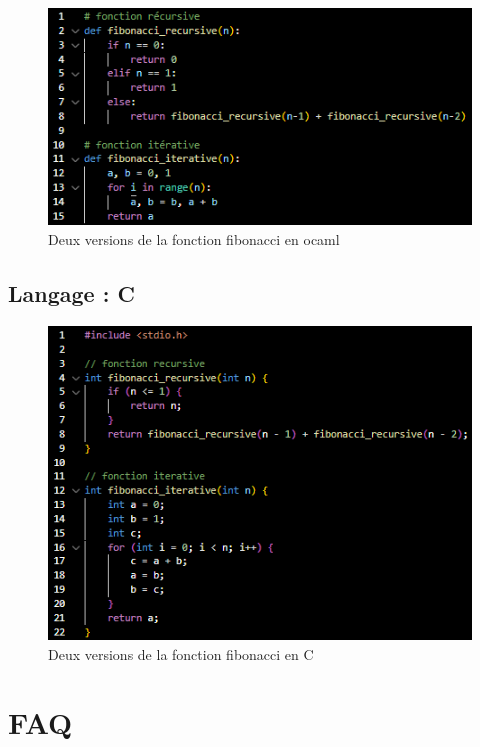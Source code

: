 \documentclass{beamer}
\begin{document}
\begin{frame}
    \begin{figure}
        \centering
        \includegraphics[width=0.9\linewidth]{ressource_diapo/fibo_ocaml.PNG}
        \caption{Deux versions de la fonction fibonacci en ocaml}
    \end{figure}
\end{frame}

\subsection{Langage : C}

\begin{frame}
    \begin{figure}
        \centering
        \includegraphics[width=0.9\linewidth]{ressource_diapo/fibo_c.PNG}
        \caption{Deux versions de la fonction fibonacci en C}
    \end{figure}
\end{frame}

\section{FAQ}
\end{document}
